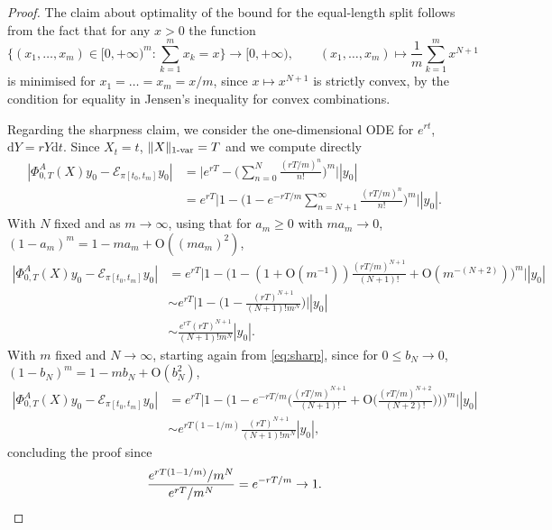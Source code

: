 \documentclass{article}
\def\d{\mathrm{d}}
\newcommand{\var}[1]{{#1 \mathchar"2D \mathrm{var}}}
\numberwithin{equation}{section}
\theoremstyle{definition}
\theoremstyle{remark}
\begin{document}
\begin{proof}
The claim about optimality of the bound for the equal-length split follows from the fact that for any $x > 0$ the function
\[
\Big\{(x_1,\ldots, x_m) \in [0,+\infty)^m : \sum_{k = 1}^m x_k = x \Big\} \to [0,+\infty), \qquad (x_1,\ldots,x_m) \mapsto \frac 1m \sum_{k = 1}^m x^{N+1}
\]
is minimised for $x_1 = \ldots = x_m = x/m$, since $x \mapsto x^{N+1}$ is strictly convex, by the condition for equality in Jensen's inequality for convex combinations.


Regarding the sharpness claim, we consider the one-dimensional ODE for $e^{rt}$, $\d Y = rY\d t$. Since $X_t = t$, $\| X \|_{\var{1}} = T$ and we compute directly
\begin{equation}\label{eq:sharp}
\begin{split}
|\Phi_{0,T}^A(X)y_0 - \mathcal E_{\pi[t_0,t_m]} y_0| &= \bigg| e^{rT} - \Big( \sum_{n = 0}^N \frac{(rT/m)^n}{n!} \Big)^m \bigg||y_0| \\
&= e^{rT}\bigg| 1 - \Big( 1 - e^{-rT/m}\sum_{n = N+1}^\infty \frac{(rT/m)^n}{n!} \Big)^m \bigg||y_0|.
\end{split}
\end{equation}
With $N$ fixed and as $m \to \infty$, using that for $a_m \geq 0$ with $ma_m \to 0$, $(1-a_m)^m = 1 - ma_m + \mathrm{O}((ma_m)^2)$,
\begin{align*}
|\Phi_{0,T}^A(X)y_0 - \mathcal E_{\pi[t_0,t_m]} y_0| &= e^{rT}\bigg| 1 - \Big( 1 - (1+\mathrm{O}(m^{-1})) \frac{(rT/m)^{N+1}}{(N+1)!} + \mathrm{O}(m^{-(N+2)}) \Big)^m \bigg||y_0| \\
&\sim e^{rT} \bigg| 1 - \bigg( 1 - \frac{(rT)^{N+1}}{(N+1)!m^N} \bigg) \bigg||y_0| \\
&\sim \frac{e^{rT} (rT)^{N+1}}{(N+1)!m^N}|y_0|.
\end{align*}
With $m$ fixed and $N \to \infty$, starting again from \eqref{eq:sharp}, since for $0 \leq b_N \to 0$, $(1-b_N)^m = 1 - mb_N + \mathrm{O}(b_N^2)$,
\begin{align*}
|\Phi_{0,T}^A(X)y_0 - \mathcal E_{\pi[t_0,t_m]} y_0| &= e^{rT}\bigg| 1 - \Big( 1 - e^{-rT/m} \Big( \frac{(rT/m)^{N+1}}{(N+1)!} + \mathrm{O}\Big(\frac{(rT/m)^{N+2}}{(N+2)!}\Big) \Big) \Big)^m \bigg||y_0| \\
&\sim e^{rT(1- 1/m)} \frac{(rT)^{N+1}}{(N+1)!m^N} |y_0|,
\end{align*}
concluding the proof since
\[
\frac{e^{rT(1- 1/m)}/m^N}{e^{rT}/m^N} = e^{-rT/m} \to 1.\qedhere
\]
\end{proof}
\end{document}

